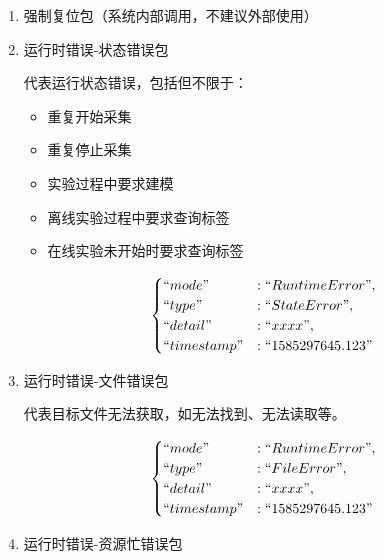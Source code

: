 \documentclass[UTF8]{article}
\begin{document}
\begin{enumerate}
    \item 强制复位包（系统内部调用，不建议外部使用）

    \item 运行时错误-状态错误包

          代表运行状态错误，包括但不限于：
          \begin{itemize}
              \item 重复开始采集
              \item   重复停止采集
              \item   实验过程中要求建模
              \item   离线实验过程中要求查询标签
              \item   在线实验未开始时要求查询标签
          \end{itemize}

          \begin{fleqn}[20pt]
              \begin{align*}\begin{cases}
                      ``mode"      & : ``RuntimeError",  \\
                      ``type"      & : ``StateError",    \\
                      ``detail"    & : ``xxxx",          \\
                      ``timestamp" & : ``1585297645.123"
                  \end{cases}\end{align*}
          \end{fleqn}

    \item 运行时错误-文件错误包

          代表目标文件无法获取，如无法找到、无法读取等。
          \begin{fleqn}[20pt]
              \begin{align*}\begin{cases}
                      ``mode"      & : ``RuntimeError",  \\
                      ``type"      & : ``FileError",     \\
                      ``detail"    & : ``xxxx",          \\
                      ``timestamp" & : ``1585297645.123"
                  \end{cases}\end{align*}
          \end{fleqn}

    \item 运行时错误-资源忙错误包


\end{enumerate}
\end{document}
